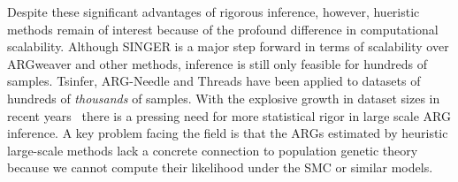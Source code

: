 \documentclass{article}
\begin{document}
Despite these significant advantages of rigorous inference, however,
hueristic methods remain of interest because of the profound difference
in computational scalability. Although SINGER is a major step forward
in terms of scalability over ARGweaver and other methods, inference is still 
only feasible for hundreds of samples. 
Tsinfer, ARG-Needle and Threads have 
been applied to datasets of hundreds of \emph{thousands} of samples.
With the explosive growth in dataset
sizes in recent years~\citep{caulfield2017national,turnbull2018100,
bycroft2018genome,backman2021exome,halldorsson2022sequences,uk2023whole,
all2024genomic,stark2024call,cook2025our}
there is a pressing need for more statistical
rigor in large scale ARG inference.
A key problem facing the field is that the ARGs estimated by heuristic large-scale 
methods lack a concrete connection to population genetic theory because
we cannot compute their likelihood under the SMC or similar models. 
\end{document}
